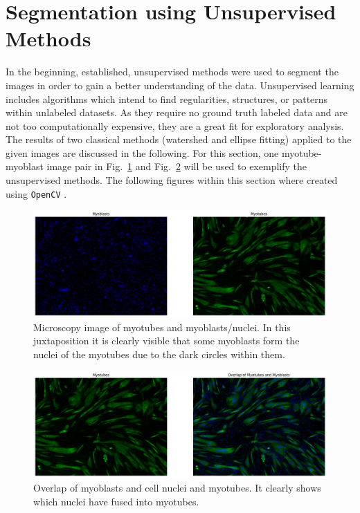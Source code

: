 \section{Segmentation using Unsupervised Methods}\label{secunsupervised}
In the beginning, established, unsupervised methods were used to segment the images in order to gain a better understanding of the data. Unsupervised learning includes algorithms which intend to find regularities, structures, or patterns within unlabeled datasets. As they require no ground truth labeled data and are not too computationally expensive, they are a great fit for exploratory analysis. The results of two classical methods (watershed and ellipse fitting) applied to the given images are discussed in the following. For this section, one myotube-myoblast image pair in Fig.~\ref{figtubeblast} and Fig.~\ref{figoverlap} will be used to exemplify the unsupervised methods. The following figures within this section where created using \texttt{OpenCV} \cite{opencv_library}.
\begin{figure}
	\centering
	\includegraphics[width=\textwidth]{"images/workhorse.png"}
	\caption[Workhorse image of myoblasts/cell nuclei and myotubes]{Microscopy image of myotubes and myoblasts/nuclei. In this juxtaposition it is clearly visible that some myoblasts form the nuclei of the myotubes due to the dark circles within them.}
	\label{figtubeblast}
\end{figure}

\begin{figure}
	\centering
	\includegraphics[width=\textwidth]{"images/overlap.png"}
	\caption[Overlap of myoblasts/cell nuclei and myotubes]{Overlap of myoblasts and cell nuclei and myotubes. It clearly shows which nuclei have fused into myotubes.}
	\label{figoverlap}
\end{figure}

